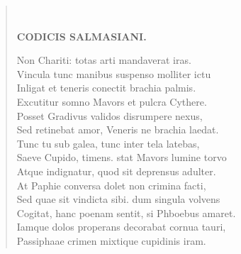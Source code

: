 \documentclass[11pt, a4paper]{report}
\begin{document}
\begin{verse}
        ﻿\pagebreak 
    \begin{center} \textbf{CODICIS SALMASIANI.} \end{center} \marginpar{[209]} Non Chariti: totas arti mandaverat iras. \\ Vincula tunc manibus suspenso molliter ictu \\ Inligat et teneris conectit brachia palmis. \\ Excutitur somno Mavors et pulcra Cythere. \\ Posset Gradivus validos disrumpere nexus, \\ Sed retinebat amor, Veneris ne brachia laedat. \\ Tunc tu sub galea, tunc inter tela latebas, \\ Saeve Cupido, timens. stat Mavors lumine torvo \\ Atque indignatur, quod sit deprensus adulter. \\ At Paphie conversa dolet non crimina facti, \\ Sed quae sit vindicta sibi. dum singula volvens \\ Cogitat, hanc poenam sentit, si Phboebus amaret. \\ Iamque dolos properans decorabat cornua tauri, \\ Passiphaae crimen mixtique cupidinis iram. \\ 
      \end{verse}
  
\end{document}
